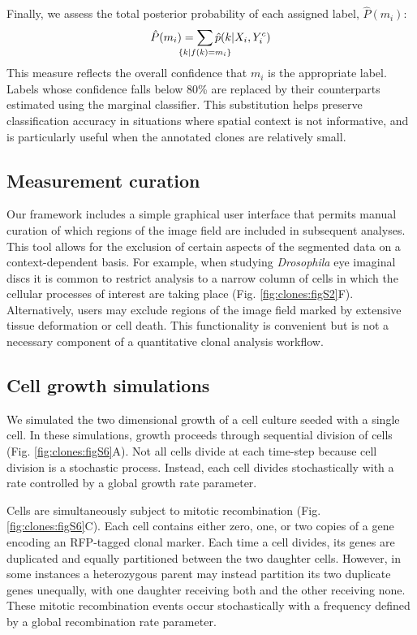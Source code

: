 Finally, we assess the total posterior probability of each assigned label, $\hat{P}(m_i)$:
\begin{equation}
\hat{P}(m_i) = \sum_{ \mathclap{ \{ k | f(k)=m_i \}} } \hat{p}(k | X_i,Y^c_i)
\end{equation}
This measure reflects the overall confidence that $m_i$ is the appropriate label. Labels whose confidence falls below 80\% are replaced by their counterparts estimated using the marginal classifier. This substitution helps preserve classification accuracy in situations where spatial context is not informative, and is particularly useful when the annotated clones are relatively small.

\subsection{Measurement curation}
\label{appendix:methods:clones:curation}

Our framework includes a simple graphical user interface that permits manual curation of which regions of the image field are included in subsequent analyses. This tool allows for the exclusion of certain aspects of the segmented data on a context-dependent basis. For example, when studying \textit{Drosophila} eye imaginal discs it is common to restrict analysis to a narrow column of cells in which the cellular processes of interest are taking place (Fig. \ref{fig:clones:figS2}F). Alternatively, users may exclude regions of the image field marked by extensive tissue deformation or cell death. This functionality is convenient but is not a necessary component of a quantitative clonal analysis workflow.

\subsection{Cell growth simulations}
\label{appendix:methods:clones:growth_simulation}

We simulated the two dimensional growth of a cell culture seeded with a single cell. In these simulations, growth proceeds through sequential division of cells (Fig. \ref{fig:clones:figS6}A). Not all cells divide at each time-step because cell division is a stochastic process. Instead, each cell divides stochastically with a rate controlled by a global growth rate parameter.

Cells are simultaneously subject to mitotic recombination (Fig. \ref{fig:clones:figS6}C). Each cell contains either zero, one, or two copies of a gene encoding an RFP-tagged clonal marker. Each time a cell divides, its genes are duplicated and equally partitioned between the two daughter cells. However, in some instances a heterozygous parent may instead partition its two duplicate genes unequally, with one daughter receiving both and the other receiving none. These mitotic recombination events occur stochastically with a frequency defined by a global recombination rate parameter.

